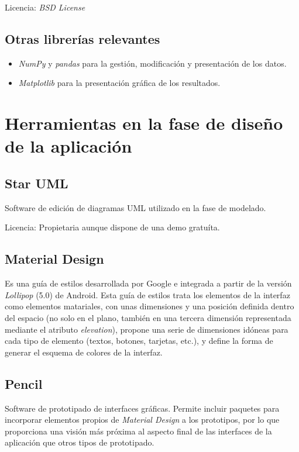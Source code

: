 Licencia: \textit{BSD License }

\subsection{Otras librerías relevantes}
\begin{itemize}
	\item \textit{NumPy} y \textit{pandas} para la gestión, modificación y presentación de los datos. 
	\item \textit{Matplotlib} para la presentación gráfica de los resultados. 
\end{itemize}

\section{Herramientas en la fase de diseño de la aplicación}

\subsection{Star UML}

Software de edición de diagramas UML utilizado en la fase de modelado. 

Licencia: Propietaria aunque dispone de una demo gratuíta. 

\subsection{Material Design}

Es una guía de estilos desarrollada por Google e integrada a partir de la versión \textit{Lollipop} (5.0) de Android. Esta guía de estilos trata los elementos de la interfaz como elementos matariales, con unas dimensiones y una posición definida dentro del espacio (no solo en el plano, también en una tercera dimensión representada mediante el atributo \textit{elevation}), propone una serie de dimensiones idóneas para cada tipo de elemento (textos, botones, tarjetas, etc.), y define la forma de generar el esquema de colores de la interfaz.

\subsection{Pencil}

Software de prototipado de interfaces gráficas. Permite incluir paquetes para incorporar elementos propios de \textit{Material Design} a los prototipos, por lo que proporciona una visión más próxima al aspecto final de las interfaces de la aplicación que otros tipos de prototipado. 

